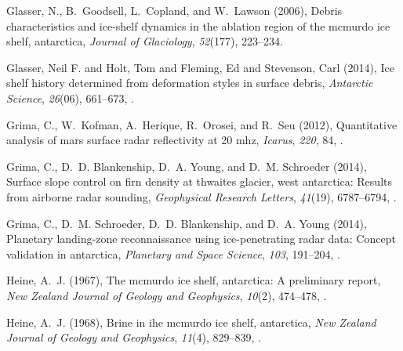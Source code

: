 \documentclass[draft,grl]{agutex}
\begin{document}
\begin{article}
\begin{thebibliography}{40}
Glasser, N., B.~Goodsell, L.~Copland, and W.~Lawson (2006), Debris
  characteristics and ice-shelf dynamics in the ablation region of the mcmurdo
  ice shelf, antarctica, \textit{Journal of Glaciology}, \textit{52}(177),
  223--234.

{Glasser, Neil F. and Holt, Tom and Fleming, Ed and Stevenson, Carl} ({2014}),
  {Ice shelf history determined from deformation styles in surface debris},
  \textit{{Antarctic Science}}, \textit{{26}}({06}), {661--673},
  .

Grima, C., W.~Kofman, A.~Herique, R.~Orosei, and R.~Seu (2012), Quantitative
  analysis of mars surface radar reflectivity at 20 mhz, \textit{Icarus},
  \textit{220}, 84, .

Grima, C., D.~D. Blankenship, D.~A. Young, and D.~M. Schroeder
  (2014{}), Surface slope control on firn density at thwaites
  glacier, west antarctica: Results from airborne radar sounding,
  \textit{Geophysical Research Letters}, \textit{41}(19), 6787--6794,
  .

Grima, C., D.~M. Schroeder, D.~D. Blankenship, and D.~A. Young
  (2014{}), Planetary landing-zone reconnaissance using
  ice-penetrating radar data: Concept validation in antarctica,
  \textit{Planetary and Space Science}, \textit{103}, 191--204,
  .

Heine, A.~J. (1967), The mcmurdo ice shelf, antarctica: A preliminary report,
  \textit{New Zealand Journal of Geology and Geophysics}, \textit{10}(2),
  474--478, .

Heine, A.~J. (1968), Brine in ihe mcmurdo ice shelf, antarctica, \textit{New
  Zealand Journal of Geology and Geophysics}, \textit{11}(4), 829--839,
  .


\end{thebibliography}
\end{article}
\end{document}
